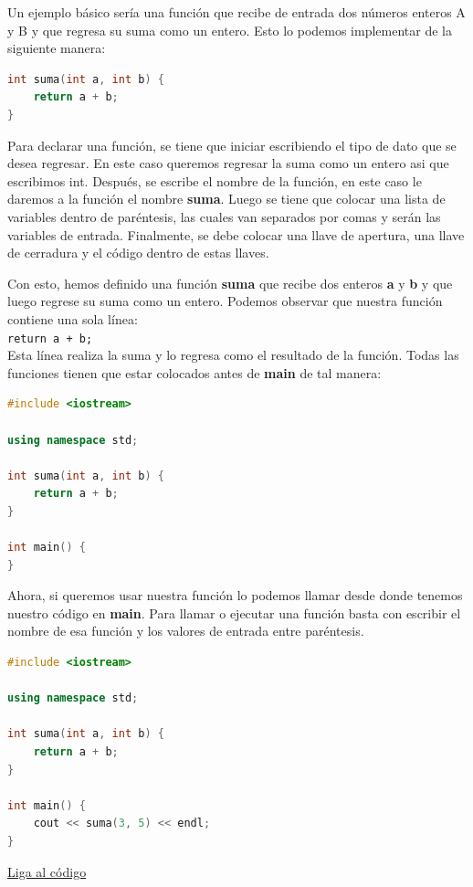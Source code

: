 \documentclass{article}
\begin{document}
Un ejemplo básico sería una función que recibe de entrada dos números enteros A y B y que regresa su suma como un entero. Esto lo podemos implementar de la siguiente manera:

\begin{lstlisting}[language=C++, title=Función de suma]
int suma(int a, int b) {
	return a + b;
}
\end{lstlisting}

Para declarar una función, se tiene que iniciar escribiendo el tipo de dato que se desea regresar. En este caso queremos regresar la suma como un entero asi que escribimos int. Después, se escribe el nombre de la función, en este caso le daremos a la función el nombre \textbf{suma}. Luego se tiene que colocar una lista de variables dentro de paréntesis, las cuales van separados por comas y serán las variables de entrada. Finalmente, se debe colocar una llave de apertura, una llave de cerradura y el código dentro de estas llaves.

Con esto, hemos definido una función \textbf{suma} que recibe dos enteros \textbf{a} y \textbf{b} y que luego regrese su suma como un entero. Podemos observar que nuestra función contiene una sola línea: \\

\lstinline{return a + b;} \\

Esta línea realiza la suma y lo regresa como el resultado de la función. Todas las funciones tienen que estar colocados antes de \textbf{main} de tal manera:

\begin{lstlisting}[language=C++, title=Función de suma]
#include <iostream>

using namespace std;

int suma(int a, int b) {
	return a + b;
}

int main() {
}
\end{lstlisting}

Ahora, si queremos usar nuestra función lo podemos llamar desde donde tenemos nuestro código en \textbf{main}. Para llamar o ejecutar una función basta con escribir el nombre de esa función y los valores de entrada entre paréntesis.

\begin{lstlisting}[language=C++, title=Función de suma]
#include <iostream>

using namespace std;

int suma(int a, int b) {
	return a + b;
}

int main() {
	cout << suma(3, 5) << endl;
}
\end{lstlisting}
\href{https://repl.it/@Jamesscn/Funciones}{Liga al código}\\
\end{document}
